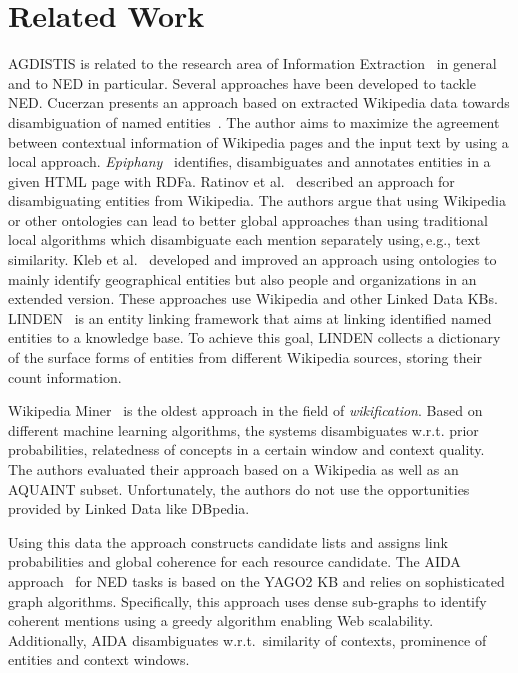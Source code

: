 \section{Related Work}
\label{sec:relatedwork}
AGDISTIS is related to the research area of Information Extraction~\cite{nad:sek} in general and to \ac{NED} in particular.
Several approaches have been developed to tackle \ac{NED}. 
Cucerzan presents an approach based on extracted Wikipedia data towards disambiguation of named entities~\cite{Cucerzan07}.
The author aims to maximize the agreement between contextual information of Wikipedia pages and the input text by using a local approach.
\emph{Epiphany}~\cite{epiphany} identifies, disambiguates and annotates entities in a given HTML page with RDFa. 
Ratinov et al.~\cite{rat:rot} described an approach for disambiguating entities from Wikipedia. 
The authors argue that using Wikipedia or other ontologies can lead to better global approaches than using traditional local algorithms which disambiguate each mention separately using,\,e.g., text similarity. %
Kleb et al.~\cite{Kleb11WIMS,KlebESWC10} developed and improved an approach using ontologies to mainly identify geographical entities but also people and organizations in an extended version. 
These approaches use Wikipedia and other Linked Data \ac{KB}s.
LINDEN~\cite{LINDEN} is an entity linking framework that aims at linking identified named entities to a knowledge base.
To achieve this goal, LINDEN collects a dictionary of the surface forms of entities from different Wikipedia sources, storing their count information.

Wikipedia Miner~\cite{milne2008learning} is the oldest approach in the field of \emph{wikification}.
Based on different machine learning algorithms, the systems disambiguates w.r.t. prior probabilities, relatedness of concepts in a certain window and context quality. 
The authors evaluated their approach based on a Wikipedia as well as an AQUAINT subset. 
Unfortunately, the authors do not use the opportunities provided by Linked Data like DBpedia.

Using this data the approach constructs candidate lists and assigns link probabilities and global coherence for each resource candidate.
The AIDA approach~\cite{AIDA} for \ac{NED} tasks is based on the YAGO2 \ac{KB} and relies on sophisticated graph algorithms. 
Specifically, this approach uses dense sub-graphs to identify coherent mentions using a greedy algorithm enabling Web scalability. 
Additionally, AIDA disambiguates w.r.t.~similarity of contexts, prominence of entities and context windows.


